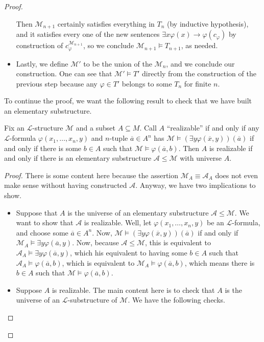 \documentclass[../notes.tex]{subfiles}
\begin{document}
\begin{proof}
\begin{itemize}
		Then $\mathcal M_{n+1}$ certainly satisfies everything in $T_n$ (by inductive hypothesis), and it satisfies every one of the new sentences $\exists x\varphi(x)\to\varphi(c_\varphi)$ by construction of $c_\varphi^{\mathcal M_{n+1}}$, so we conclude $\mathcal M_{n+1}\models T_{n+1}$, as needed.
		\item Lastly, we define $\mathcal M'$ to be the union of the $\mathcal M_n$, and we conclude our construction. One can see that $\mathcal M'\models T'$ directly from the construction of the previous step because any $\varphi\in T'$ belongs to some $T_n$ for finite $n$.
	\end{itemize}
	To continue the proof, we want the following result to check that we have built an elementary substructure.
	\begin{lemma} \label{lem:tarski-vaught}
		Fix an $\mathcal L$-structure $\mathcal M$ and a subset $A\subseteq M$. Call $A$ ``realizable'' if and only if any $\mathcal L$-formula $\varphi(x_1,\ldots,x_n,y)$ and $n$-tuple $\overline a\in A^n$ has $\mathcal M\models(\exists y\varphi(\overline x,y))(\overline a)$ if and only if there is some $b\in A$ such that $\mathcal M\models\varphi(\overline a,b)$. Then $A$ is realizable if and only if there is an elementary substructure $\mathcal A\le\mathcal M$ with universe $A$.
	\end{lemma}
	\begin{proof}
		There is some content here because the assertion $\mathcal M_A\equiv\mathcal A_A$ does not even make sense without having constructed $\mathcal A$. Anyway, we have two implications to show.
		\begin{itemize}
			\item Suppose that $A$ is the universe of an elementary substructure $\mathcal A\le\mathcal M$. We want to show that $\mathcal A$ is realizable. Well, let $\varphi(x_1,\ldots,x_n,y)$ be an $\mathcal L$-formula, and choose some $\overline a\in A^n$. Now, $\mathcal M\models(\exists y\varphi(\overline x,y))(\overline a)$ if and only if $\mathcal M_A\models\exists y\varphi(\overline a,y)$. Now, because $\mathcal A\le\mathcal M$, this is equivalent to $\mathcal A_A\models\exists y\varphi(\overline a,y)$, which his equivalent to having some $b\in A$ such that $\mathcal A_A\models\varphi(\overline a,b)$, which is equivalent to $\mathcal M_A\models\varphi(\overline a,b)$, which means there is $b\in A$ such that $\mathcal M\models\varphi(\overline a,b)$.
			\item Suppose $A$ is realizable. The main content here is to check that $A$ is the universe of an $\mathcal L$-substructure of $\mathcal M$. We have the following checks.

\end{itemize}
\end{proof}
\end{proof}
\end{document}
